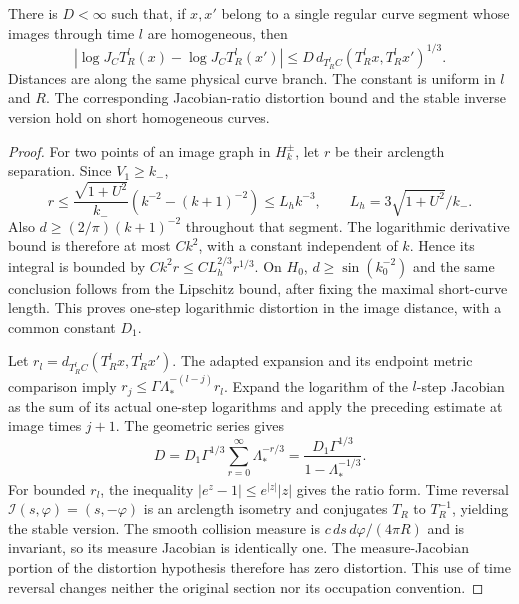 \begin{theorem}
\label{thm:uc-distortion}
There is $D<\infty$ such that, if $x,x'$ belong to a single regular
curve segment whose images through time $l$ are homogeneous, then
\begin{equation}\label{eq:uc-distortion}
 |\log J_C T_R^l(x)-\log J_C T_R^l(x')|
 \le D\,d_{T_R^l C}(T_R^lx,T_R^lx')^{1/3}.
\end{equation}
Distances are along the same physical curve branch. The constant is
uniform in $l$ and $R$. The corresponding Jacobian-ratio distortion bound
and the stable inverse version hold on short homogeneous curves.
\end{theorem}
\begin{proof}
For two points of an image graph in $H_k^\pm$, let $r$ be their
arclength separation. Since $V_1\ge k_-$,
\[
 r\le \frac{\sqrt{1+U^2}}{k_-}
           (k^{-2}-(k+1)^{-2})\le L_h k^{-3},
 \qquad L_h=3\sqrt{1+U^2}/k_-.
\]
Also $d\ge (2/\pi)(k+1)^{-2}$ throughout that segment. The
logarithmic derivative bound is therefore at most $C k^2$, with a
constant independent of $k$. Hence its integral is bounded by
$C k^2r\le C L_h^{2/3}r^{1/3}$.
On $H_0$, $d\ge\sin(k_0^{-2})$ and the same conclusion follows
from the Lipschitz bound, after fixing the maximal short-curve length.
This proves one-step logarithmic distortion in the image distance,
with a common constant $D_1$.

Let $r_l=d_{T_R^l C}(T_R^lx,T_R^lx')$.
The adapted expansion and its endpoint metric comparison imply
$r_j\le\Gamma\Lambda_*^{-(l-j)}r_l$. Expand the logarithm of the
$l$-step Jacobian as the sum of its actual one-step logarithms and apply
the preceding estimate at image times $j+1$. The geometric series gives
\[
 D=D_1\Gamma^{1/3}\sum_{r=0}^{\infty}\Lambda_*^{-r/3}
        =\frac{D_1\Gamma^{1/3}}{1-\Lambda_*^{-1/3}}.
\]
For bounded $r_l$, the inequality $|e^z-1|\le e^{|z|}|z|$ gives
the ratio form. Time reversal $\mathcal I(s,\varphi)=(s,-\varphi)$
is an arclength isometry and conjugates $T_R$ to $T_R^{-1}$, yielding
the stable version. The smooth collision measure is
$c\,ds\,d\varphi/(4\pi R)$ and is invariant, so its measure Jacobian
is identically one. The measure-Jacobian portion of the distortion
hypothesis therefore has zero distortion. This use of time reversal
changes neither the original section nor its occupation convention.
\end{proof}


